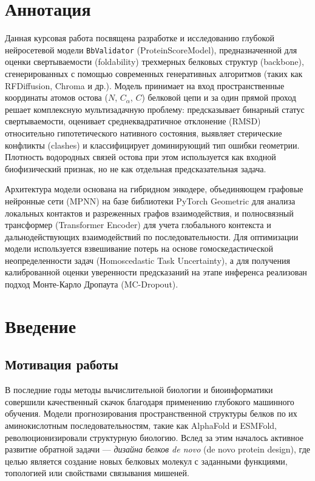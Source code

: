 \documentclass[12pt, a4paper]{article}
\begin{document}
\section*{Аннотация}
Данная курсовая работа посвящена разработке и исследованию глубокой нейросетевой модели \texttt{BbValidator} (ProteinScoreModel), предназначенной для оценки свертываемости (foldability) трехмерных белковых структур (backbone), сгенерированных с помощью современных генеративных алгоритмов (таких как RFDiffusion, Chroma и др.). Модель принимает на вход пространственные координаты атомов остова ($N$, $C_\alpha$, $C$) белковой цепи и за один прямой проход решает комплексную мультизадачную проблему: предсказывает бинарный статус свертываемости, оценивает среднеквадратичное отклонение (RMSD) относительно гипотетического нативного состояния, выявляет стерические конфликты (clashes) и классифицирует доминирующий тип ошибки геометрии. Плотность водородных связей остова при этом используется как входной биофизический признак, но не как отдельная предсказательная задача. 

Архитектура модели основана на гибридном энкодере, объединяющем графовые нейронные сети (MPNN) на базе библиотеки PyTorch Geometric для анализа локальных контактов и разреженных графов взаимодействия, и полносвязный трансформер (Transformer Encoder) для учета глобального контекста и дальнодействующих взаимодействий по последовательности. Для оптимизации модели используется взвешивание потерь на основе гомоскедастической неопределенности задач (Homoscedastic Task Uncertainty), а для получения калиброванной оценки уверенности предсказаний на этапе инференса реализован подход Монте-Карло Дропаута (MC-Dropout).

\newpage

\tableofcontents
\newpage

\section{Введение}

\subsection{Мотивация работы}
В последние годы методы вычислительной биологии и биоинформатики совершили качественный скачок благодаря применению глубокого машинного обучения. Модели прогнозирования пространственной структуры белков по их аминокислотным последовательностям, такие как AlphaFold и ESMFold, революционизировали структурную биологию. Вслед за этим началось активное развитие обратной задачи — \textit{дизайна белков de novo} (de novo protein design), где целью является создание новых белковых молекул с заданными функциями, топологией или свойствами связывания мишеней. 
\end{document}
